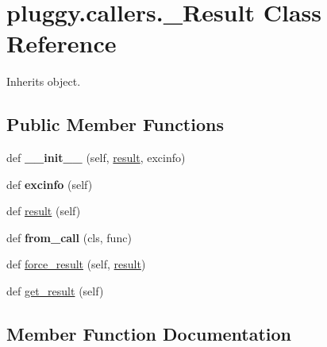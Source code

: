 \hypertarget{classpluggy_1_1callers_1_1___result}{}\section{pluggy.\+callers.\+\_\+\+Result Class Reference}
\label{classpluggy_1_1callers_1_1___result}


Inherits object.

\subsection*{Public Member Functions}
\begin{DoxyCompactItemize}
\item 
\mbox{\label{classpluggy_1_1callers_1_1___result_a5f46e019a82fe5ad39bea9b9f9d67775}} 
def {\bfseries \+\_\+\+\_\+init\+\_\+\+\_\+} (self, \hyperlink{classpluggy_1_1callers_1_1___result_a2dd253e2f46a2acc2e924edec3e63e21}{result}, excinfo)
\item 
\mbox{\label{classpluggy_1_1callers_1_1___result_a2285135dd9642cfe46c19d0911c050a6}} 
def {\bfseries excinfo} (self)
\item 
def \hyperlink{classpluggy_1_1callers_1_1___result_a2dd253e2f46a2acc2e924edec3e63e21}{result} (self)
\item 
\mbox{\label{classpluggy_1_1callers_1_1___result_a2856d935bdfc74693c262f85e084facd}} 
def {\bfseries from\+\_\+call} (cls, func)
\item 
def \hyperlink{classpluggy_1_1callers_1_1___result_ad91fbd3d11004cd7085bbab4e5e9b4e0}{force\+\_\+result} (self, \hyperlink{classpluggy_1_1callers_1_1___result_a2dd253e2f46a2acc2e924edec3e63e21}{result})
\item 
def \hyperlink{classpluggy_1_1callers_1_1___result_a518b55f803ba4669e9277cf38d6aa335}{get\+\_\+result} (self)
\end{DoxyCompactItemize}


\subsection{Member Function Documentation}
\mbox{\label{classpluggy_1_1callers_1_1___result_ad91fbd3d11004cd7085bbab4e5e9b4e0}} 
